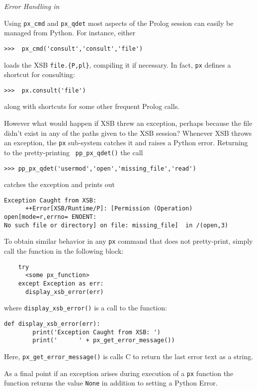 \begin{example} \rm {\it Error Handling in \px}

Using {\tt px\_cmd} and {\tt px\_qdet} most aspects of the Prolog
session can easily be managed from Python.  For instance, either

\begin{verbatim}
>>>  px_cmd('consult','consult','file')
\end{verbatim}

\noindent
loads the XSB {\tt file.\{P,pl\}}, compiling it if necessary.  In
fact, {\tt px} defines a shortcut for consulting:

\begin{verbatim}
>>>  px.consult('file')
\end{verbatim}

\noindent
along with shortcuts for some other frequent Prolog calls.

However what would happen if XSB threw an exception, perhaps because
the file didn't exist in any of the paths given to the XSB session?
Whenever XSB throws an exception, the {\tt px} sub-system catches it
and raises a Python error.  Returning to the pretty-printing {\tt
  pp\_px\_qdet()} the call

\begin{verbatim}
>>> pp_px_qdet('usermod','open','missing_file','read')
\end{verbatim}

\noindent
catches the exception and prints out

\begin{verbatim} 
Exception Caught from XSB: 
      ++Error[XSB/Runtime/P]: [Permission (Operation) open[mode=r,errno= ENOENT: 
No such file or directory] on file: missing_file]  in /(open,3)
\end{verbatim}

To obtain similar behavior in any {\tt px} command that does not
pretty-print, simply call the function in the following block:

\begin{verbatim}
    try
      <some px_function>
    except Exception as err:
      display_xsb_error(err)
\end{verbatim}
\noindent
where {\tt display\_xsb\_error()} is a call to the function:

\begin{verbatim}
def display_xsb_error(err):    
        print('Exception Caught from XSB: ')
        print('      ' + px_get_error_message())
\end{verbatim}

\noindent
Here, {\tt px\_get\_error\_message()} is calls C to return the last
\px{} error text as a string.

As a final point if an exception arises during execution of a {\tt px}
function the function returns the value {\tt None} in addition to
setting a Python Error.
\end{example}

